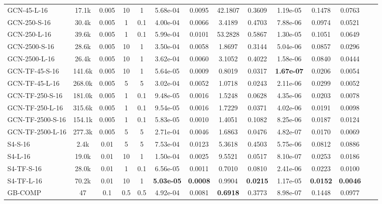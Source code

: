 \begin{table*}[h]
{\begin{tabular}{lccccccccccccc}
            GCN-45-L-16 & 17.1k & 0.005 & 10 & 1 & 5.68e-04 & 0.0095 & 42.1807 & 0.3609 & 1.19e-05 & 0.1478 & 0.0763 \\
            GCN-250-S-16 & 30.4k & 0.005 & 1 & 0.1 & 4.00e-04 & 0.0066 & 3.4189 & 0.4703 & 7.88e-06 & 0.0974 & 0.0521 \\
            GCN-250-L-16 & 39.6k & 0.005 & 1 & 0.1 & 5.99e-04 & 0.0101 & 53.2828 & 0.5867 & 1.30e-05 & 0.1051 & 0.0649 \\
            GCN-2500-S-16 & 28.6k & 0.005 & 10 & 1 & 3.50e-04 & 0.0058 & 1.8697 & 0.3144 & 5.04e-06 & 0.0857 & 0.0296 \\
            GCN-2500-L-16 & 26.4k & 0.005 & 10 & 1 & 3.62e-04 & 0.0060 & 3.1052 & 0.4022 & 1.58e-06 & 0.0840 & 0.0444 \\
            \hline
            GCN-TF-45-S-16 & 141.6k & 0.005 & 10 & 1 & 5.64e-05 & 0.0009 & 0.8019 & 0.0317 & \textbf{1.67e-07} & 0.0206 & 0.0054 \\
            GCN-TF-45-L-16 & 268.0k & 0.005 & 5 & 5 & 3.02e-04 & 0.0052 & 1.0718 & 0.0243 & 2.11e-06 & 0.0299 & 0.0052 \\
            GCN-TF-250-S-16 & 181.0k & 0.005 & 1 & 0.1 & 9.48e-05 & 0.0016 & 1.5248 & 0.0628 & 4.35e-06 & 0.0203 & 0.0078 \\
            GCN-TF-250-L-16 & 315.6k & 0.005 & 1 & 0.1 & 9.54e-05 & 0.0016 & 1.7229 & 0.0371 & 4.02e-06 & 0.0191 & 0.0098 \\
            GCN-TF-2500-S-16 & 154.1k & 0.005 & 1 & 0.1 & 5.83e-05 & 0.0010 & 1.4051 & 0.1082 & 8.25e-06 & 0.0187 & 0.0124 \\
            GCN-TF-2500-L-16 & 277.3k & 0.005 & 5 & 5 & 2.71e-04 & 0.0046 & 1.6863 & 0.0476 & 4.82e-07 & 0.0170 & 0.0069 \\
            \hline
            S4-S-16 & 2.4k & 0.01 & 5 & 5 & 7.53e-04 & 0.0123 & 5.3618 & 0.4503 & 5.75e-06 & 0.0812 & 0.0886 \\
            S4-L-16 & 19.0k & 0.01 & 10 & 1 & 1.50e-04 & 0.0025 & 9.5521 & 0.0517 & 8.10e-07 & 0.0253 & 0.0186 \\
            \hline
            S4-TF-S-16 & 28.0k & 0.01 & 1 & 0.1 & 6.56e-05 & 0.0011 & 0.7010 & 0.0810 & 2.41e-06 & 0.0223 & 0.0100 \\
            S4-TF-L-16 & 70.2k & 0.01 & 10 & 1 & \textbf{5.03e-05} & \textbf{0.0008} & 0.9904 & \textbf{0.0215} & 1.17e-05 & \textbf{0.0152} & \textbf{0.0046} \\
            \hline
            GB-COMP & 47 & 0.1 & 0.5 & 0.5 & 4.92e-04 & 0.0081 & \textbf{0.6918} & 0.3773 & 8.98e-07 & 0.1448 & 0.0977 \\
            \hline
            \hline
        \end{tabular}
    }
\end{table*}

